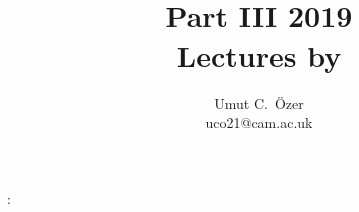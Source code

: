 \usepackage{amsthm}
  {\topsep}%
  {\topsep}%
  {\normalfont}%
  {}%
  {\bfseries}%
  {:}%
  { }%
  {}%
\theoremstyle{StandardStyle}

\newtheorem{theorem}{Theorem}
\newtheorem{lemma}[theorem]{Lemma}
\newtheorem{claim}{Claim}
\newtheorem*{proposition}{Proposition}
\newtheorem*{corollary}{Corollary}

\newtheorem{definition}{Definition}
\newtheorem*{notation}{Notation}

\newtheorem*{example}{Example}
\newtheorem{exercise}{Exercise}[chapter]

\usepackage{framed} %
\newtheorem*{remark}{Remark}

\newcommand{\bdd}[2][]{\mathop{\mathrm{d\hspace*{-0.2em}\bar{}\hspace*{0.2em}}^{#1}\hspace*{-0.05em}{#2}}}

\newcommand{\bdelta}{\delta\hspace*{-0.2em}\bar{}\hspace*{0.2em}}

\newcommand*\pdd[1]{\mathop{\mathcal{D} #1}}

\newcommand{\normalorder}[1]{\mathop{:}\nolimits\!#1\!\mathop{:}\nolimits}

\author{Umut C.~\"Ozer\\uco21@cam.ac.uk}
\title{{\Huge \coursetitle{}}\\
Part III \term{} 2019\\
Lectures by \lecturer{}}
